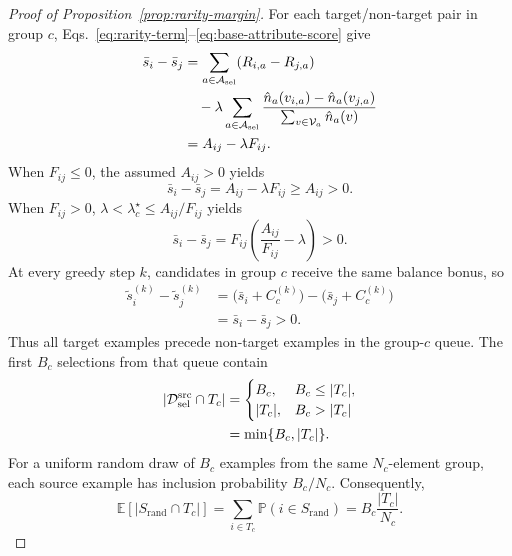 \begin{tcolorbox}[
    colback=green!2!white,
    colframe=green!20!white,
    arc=3pt,
    boxrule=1pt,
    drop shadow,
    breakable
]
\begin{proof}[Proof of Proposition~\ref{prop:rarity-margin}]
For each target/non-target pair in group $c$, Eqs.~\ref{eq:rarity-term}--\ref{eq:base-attribute-score} give
\begin{align}
\bar{s}_i-\bar{s}_j
&=\sum_{a\in\mathcal{A}_{\mathrm{sel}}}(R_{i,a}-R_{j,a})\notag\\
&\quad-\lambda\sum_{a\in\mathcal{A}_{\mathrm{sel}}}
\frac{\hat n_a(v_{i,a})-\hat n_a(v_{j,a})}
{\sum_{v\in\mathcal{V}_a}\hat n_a(v)}\notag\\
&=A_{ij}-\lambda F_{ij}.\label{eq:base-score-gap}
\end{align}
When $F_{ij}\leq0$, the assumed $A_{ij}>0$ yields
\begin{equation*}
\bar{s}_i-\bar{s}_j=A_{ij}-\lambda F_{ij}\geq A_{ij}>0.
\end{equation*}
When $F_{ij}>0$, $\lambda<\lambda_c^\star\leq A_{ij}/F_{ij}$ yields
\begin{equation*}
\bar{s}_i-\bar{s}_j
=F_{ij}\left(\frac{A_{ij}}{F_{ij}}-\lambda\right)>0.
\end{equation*}
At every greedy step $k$, candidates in group $c$ receive the same balance bonus, so
\begin{align*}
\tilde{s}_i^{(k)}-\tilde{s}_j^{(k)}
&=\big(\bar{s}_i+C_c^{(k)}\big)-\big(\bar{s}_j+C_c^{(k)}\big)\\
&=\bar{s}_i-\bar{s}_j>0.
\end{align*}
Thus all target examples precede non-target examples in the group-$c$ queue. The first $B_c$ selections from that queue contain
\begin{align*}
|\mathcal{D}_{\mathrm{sel}}^{\mathrm{src}}\cap T_c|
&=\begin{cases}
B_c,& B_c\leq |T_c|,\\
|T_c|,& B_c>|T_c|
\end{cases}\\
&=\min\{B_c,|T_c|\}.
\end{align*}
For a uniform random draw of $B_c$ examples from the same $N_c$-element group, each source example has inclusion probability $B_c/N_c$. Consequently,
\begin{equation*}
\mathbb{E}[|S_{\mathrm{rand}}\cap T_c|]
=\sum_{i\in T_c}\mathbb{P}(i\in S_{\mathrm{rand}})
=B_c\frac{|T_c|}{N_c}.
\end{equation*}
\end{proof}
\end{tcolorbox}

